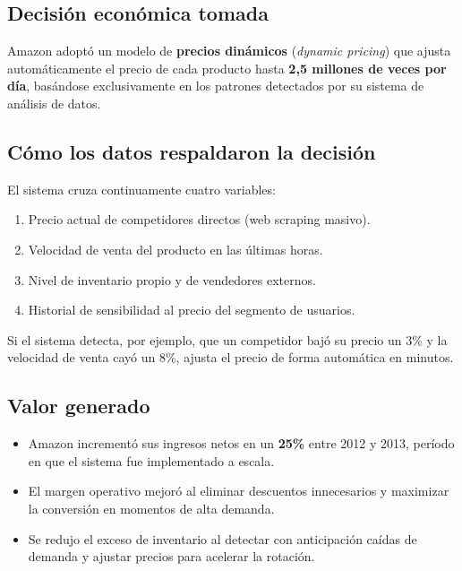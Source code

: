 \documentclass[12pt, a4paper]{article}
\begin{document}
\subsection{Decisión económica tomada}

Amazon adoptó un modelo de \textbf{precios dinámicos} (\textit{dynamic pricing}) que ajusta automáticamente el precio de cada producto hasta \textbf{2,5 millones de veces por día}, basándose exclusivamente en los patrones detectados por su sistema de análisis de datos.

\subsection{Cómo los datos respaldaron la decisión}

El sistema cruza continuamente cuatro variables:

\begin{enumerate}[label=(\alph*), leftmargin=2cm]
  \item Precio actual de competidores directos (web scraping masivo).
  \item Velocidad de venta del producto en las últimas horas.
  \item Nivel de inventario propio y de vendedores externos.
  \item Historial de sensibilidad al precio del segmento de usuarios.
\end{enumerate}

Si el sistema detecta, por ejemplo, que un competidor bajó su precio un 3\% y la velocidad de venta cayó un 8\%, ajusta el precio de forma automática en minutos.

\subsection{Valor generado}

\begin{itemize}[leftmargin=1.5cm]
  \item Amazon incrementó sus ingresos netos en un \textbf{25\%} entre 2012 y 2013, período en que el sistema fue implementado a escala.
  \item El margen operativo mejoró al eliminar descuentos innecesarios y maximizar la conversión en momentos de alta demanda.
  \item Se redujo el exceso de inventario al detectar con anticipación caídas de demanda y ajustar precios para acelerar la rotación.
\end{itemize}
\end{document}
